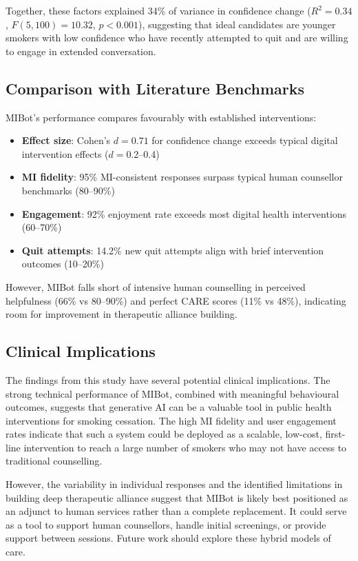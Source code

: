 Together, these factors explained 34\% of variance in confidence change ($R^2=0.34$, $F(5,100)=10.32$, $p<0.001$), suggesting that ideal candidates are younger smokers with low confidence who have recently attempted to quit and are willing to engage in extended conversation.

\subsection{Comparison with Literature Benchmarks}

MIBot's performance compares favourably with established interventions:

\begin{itemize}
\item \textbf{Effect size}: Cohen's $d=0.71$ for confidence change exceeds typical digital intervention effects ($d=0.2$--0.4) \citep{Whittaker2016}
\item \textbf{MI fidelity}: 95\% MI-consistent responses surpass typical human counsellor benchmarks (80--90\%) \citep{Moyers2016}
\item \textbf{Engagement}: 92\% enjoyment rate exceeds most digital health interventions (60--70\%) \citep{Perski2017}
\item \textbf{Quit attempts}: 14.2\% new quit attempts align with brief intervention outcomes (10--20\%) \citep{Stead2013}
\end{itemize}

However, MIBot falls short of intensive human counselling in perceived helpfulness (66\% vs 80--90\%) and perfect CARE scores (11\% vs 48\%), indicating room for improvement in therapeutic alliance building.

\subsection{Clinical Implications}

The findings from this study have several potential clinical implications. The strong technical performance of MIBot, combined with meaningful behavioural outcomes, suggests that generative AI can be a valuable tool in public health interventions for smoking cessation. The high MI fidelity and user engagement rates indicate that such a system could be deployed as a scalable, low-cost, first-line intervention to reach a large number of smokers who may not have access to traditional counselling.

However, the variability in individual responses and the identified limitations in building deep therapeutic alliance suggest that MIBot is likely best positioned as an adjunct to human services rather than a complete replacement. It could serve as a tool to support human counsellors, handle initial screenings, or provide support between sessions. Future work should explore these hybrid models of care.

